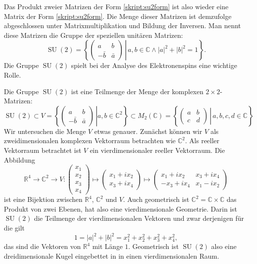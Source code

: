 Das Produkt zweier Matrizen der Form \eqref{skript:su2form} ist also wieder eine
Matrix der Form \eqref{skript:su2form}.
Die Menge dieser Matrizen ist demzufolge abgeschlossen unter
Matrixmultiplikation und Bildung der Inversen.
Man nennt diese Matrizen die Gruppe der speziellen unitären Matrizen:
\[
\operatorname{SU}(2)=\left\{
\left.
\begin{pmatrix}
a&b\\-\bar b&\bar a
\end{pmatrix}
\,
\right|
\,
a,b\in\mathbb C\wedge
|a|^2+|b|^2=1
\right\}.
\]
Die Gruppe $\operatorname{SU}(2)$ spielt bei der Analyse des Elektronenspins
eine wichtige Rolle.

Die Gruppe $\operatorname{SU}(2)$ ist eine Teilmenge der Menge der komplexen
$2\times 2$-Matrizen:
\[
\operatorname{SU}(2)
\subset
V=
\left\{
\left.
\begin{pmatrix}a&b\\-\bar b&\bar a\end{pmatrix}\,
\right|
a,b\in\mathbb C^2
\right\}
\subset
M_2(\mathbb C)
=\left\{
\left.
\begin{pmatrix}
a&b\\c&d
\end{pmatrix}
\,
\right|
\, a,b,c,d\in\mathbb C
\right\}
\]
Wir untersuchen die Menge $V$ etwas genauer.
Zunächst können wir $V$ als zweidimensionalen komplexen Vektorraum
betrachten wie $\mathbb C^2$.
Als reeller Vektorraum betrachtet ist $V$ ein vierdimensionaler
reeller Vektorraum. Die Abbildung
\[
\mathbb R^4\to\mathbb C^2\to V
:
\begin{pmatrix}x_1\\x_2\\x_3\\x_4\end{pmatrix}\mapsto
\begin{pmatrix}x_1+ix_2\\x_3+ix_4\end{pmatrix}\mapsto
\begin{pmatrix} x_1+ix_2 & x_3+ix_4 \\
               -x_3+ix_4 & x_1-ix_2 \end{pmatrix}
\]
ist eine Bijektion zwischen $\mathbb R^4$, $\mathbb C^2$ und $V$.
Auch geometrisch ist $\mathbb C^2=\mathbb C\times \mathbb C$ das Produkt
von zwei Ebenen, hat also eine vierdimensionale Geometrie.
Darin ist $\operatorname{SU}(2)$ die Teilmenge der vierdimensionalen Vektoren
und zwar derjenigen für die gilt
\[
1
=
|a|^2+|b|^2
= 
x_1^2 + x_2^2 + x_3^2 + x_4^2,
\]
das sind die Vektoren von $\mathbb R^4$ mit Länge $1$.
Geometrisch ist $\operatorname{SU}(2)$ also eine dreidimensionale Kugel
eingebettet in in einen vierdimensionalen Raum.

